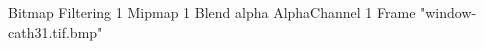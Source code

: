 {Bitmap
	{Filtering 1}
	{Mipmap 1}
	{Blend alpha}
	{AlphaChannel 1}
	{Frame "window-cath31.tif.bmp"}
}
